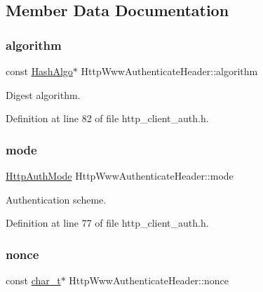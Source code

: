 \subsection{Member Data Documentation}
\mbox{\label{structHttpWwwAuthenticateHeader_ad1152391a0ce4952518a457f5082e128}} 
\subsubsection{\texorpdfstring{algorithm}{algorithm}}
{\footnotesize\ttfamily const \hyperlink{structHashAlgo}{Hash\+Algo}$\ast$ Http\+Www\+Authenticate\+Header\+::algorithm}



Digest algorithm. 



Definition at line 82 of file http\+\_\+client\+\_\+auth.\+h.

\mbox{\label{structHttpWwwAuthenticateHeader_a776f86c339aba82d0b145c83d366d243}} 
\subsubsection{\texorpdfstring{mode}{mode}}
{\footnotesize\ttfamily \hyperlink{http__common_8h_ad435f9e57a3351beaec6fc809eff4f31}{Http\+Auth\+Mode} Http\+Www\+Authenticate\+Header\+::mode}



Authentication scheme. 



Definition at line 77 of file http\+\_\+client\+\_\+auth.\+h.

\mbox{\label{structHttpWwwAuthenticateHeader_a6affcd43ab95104141feb6e942cfa847}} 
\subsubsection{\texorpdfstring{nonce}{nonce}}
{\footnotesize\ttfamily const \hyperlink{compiler__port_8h_a40bb5262bf908c328fbcfbe5d29d0201}{char\+\_\+t}$\ast$ Http\+Www\+Authenticate\+Header\+::nonce}



